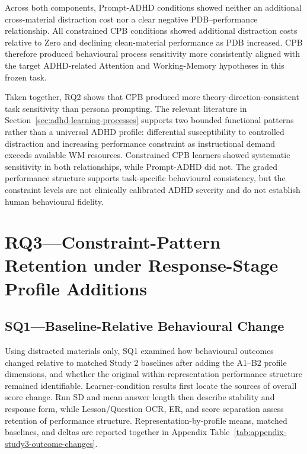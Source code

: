 Across both components, Prompt-ADHD conditions showed neither an additional cross-material distraction cost nor a clear negative PDB--performance relationship. All constrained CPB conditions showed additional distraction costs relative to Zero and declining clean-material performance as PDB increased. CPB therefore produced behavioural process sensitivity more consistently aligned with the target ADHD-related Attention and Working-Memory hypotheses in this frozen task.

Taken together, RQ2 shows that CPB produced more theory-direction-consistent task sensitivity than persona prompting. The relevant literature in Section~\ref{sec:adhd-learning-processes} supports two bounded functional patterns rather than a universal ADHD profile: differential susceptibility to controlled distraction and increasing performance constraint as instructional demand exceeds available WM resources. Constrained CPB learners showed systematic sensitivity in both relationships, while Prompt-ADHD did not. The graded performance structure supports task-specific behavioural consistency, but the constraint levels are not clinically calibrated ADHD severity and do not establish human behavioural fidelity.

\FloatBarrier

\section[RQ3---Constraint-Pattern Retention under Profile Additions]{RQ3---Constraint-Pattern Retention under Response-Stage Profile Additions}
\label{sec:rq3-results}

\subsection{SQ1---Baseline-Relative Behavioural Change}
\label{subsec:rq3-sq1}

Using distracted materials only, SQ1 examined how behavioural outcomes changed relative to matched Study 2 baselines after adding the A1--B2 profile dimensions, and whether the original within-representation performance structure remained identifiable. Learner-condition results first locate the sources of overall score change. Run SD and mean answer length then describe stability and response form, while Lesson/Question OCR, ER, and score separation assess retention of performance structure. Representation-by-profile means, matched baselines, and deltas are reported together in Appendix Table~\ref{tab:appendix-study3-outcome-changes}.

